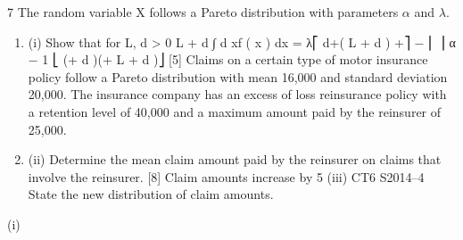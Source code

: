 \documentclass[a4paper,12pt]{article}
\begin{document}
7
The random variable X follows a Pareto distribution with parameters $\alpha$  and $\lambda$.
\begin{enumerate}
\item (i)
Show that for L, d > 0
L + d
∫ d
xf ( x ) dx =
λ\alpha  ⎡ d\alpha  +\lambda \alpha  ( L + d ) +\lambda  ⎤
−
⎢
⎥
α − 1 ⎣ (\lambda  + d )\alpha  (\lambda  + L + d )\alpha  ⎦
[5]
Claims on a certain type of motor insurance policy follow a Pareto distribution with
mean 16,000 and standard deviation 20,000. The insurance company has an excess of
loss reinsurance policy with a retention level of 40,000 and a maximum amount paid
by the reinsurer of 25,000.
\item (ii)
Determine the mean claim amount paid by the reinsurer on claims that involve
the reinsurer.
[8]
Claim amounts increase by 5%
\itemg(iii)
CT6 S2014–4
State the new distribution of claim amounts.
\end{enumerate}

\newpage
(i)
\end{document}
